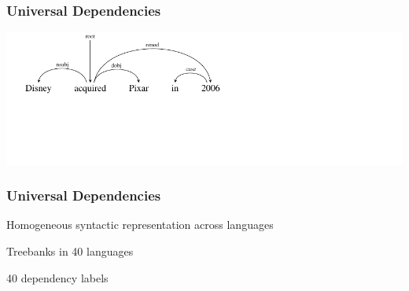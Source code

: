 \documentclass[mathserif,12pt]{beamer}
\begin{document}
\begin{frame}
\frametitle{Universal Dependencies}
\begin{center}
\includegraphics[trim=0em 5em 15em 0em,clip=true,scale=1.2
]{figures/dependency-word-order-english}

\end{center}
\end{frame} 

\begin{frame}[noframenumbering]
\frametitle{Universal Dependencies}
\large
Homogeneous syntactic representation across languages

\vspace{2em}
Treebanks in 40 languages

\vspace{2em}
40 dependency labels

\end{frame} 
\end{document}
